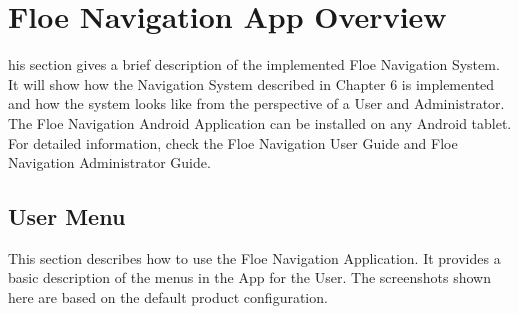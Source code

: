 %
%
\let\textcircled=\pgftextcircled
\chapter{Floe Navigation App Overview}
\label{chap:fnsoverview}
\noindent
{}his section gives a brief description of the implemented Floe Navigation System. It will show how the Navigation System described in Chapter 6 is implemented and how the system looks like from the perspective of a User and Administrator. The Floe Navigation Android Application can be installed on any Android tablet. For detailed information, check the Floe Navigation User Guide and Floe Navigation Administrator Guide.%
%
\section{User Menu}
\label{sec:sec7_1}
\noindent
 This section describes how to use the Floe Navigation Application. It provides a basic description of the menus in the App for the User. The screenshots shown here are based on the default product configuration.
%
